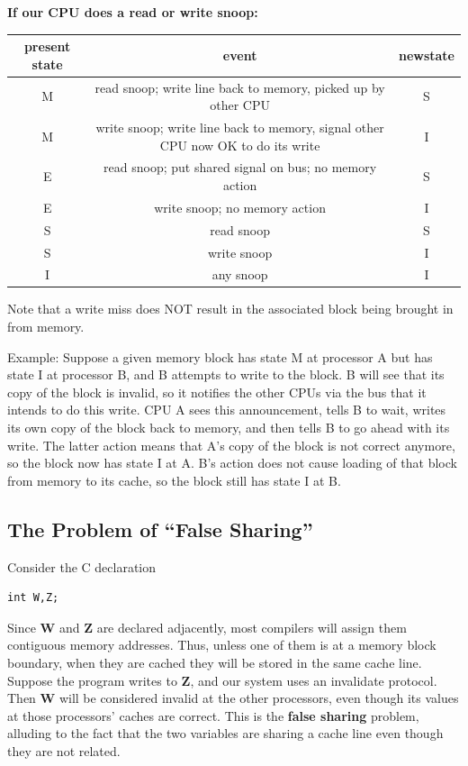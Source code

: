 \par{} \vspace{0.3cm}

{\bf If our CPU does a read or write snoop:}

\begin{tabular}{|c|c|c|}
\hline 
present state&
 event&
 newstate\\
\hline 
M&
 read snoop; write line back to memory, picked up by other CPU&
 S\\
\hline 
M&
 write snoop; write line back to memory, signal other CPU now OK to do its
 write&
 I\\
\hline 
E&
 read snoop; put shared signal on bus; no memory action&
 S\\
\hline 
E&
 write snoop; no memory action&
 I\\
\hline 
S&
 read snoop&
 S\\
\hline 
S&
 write snoop&
 I\\
\hline 
I&
 any snoop&
 I \\
\hline 
\end{tabular}

Note that a write miss does NOT result in the associated block being
brought in from memory.  

Example:  Suppose a given memory block has state M at processor A but
has state I at processor B, and B attempts to write to the block.  B
will see that its copy of the block is invalid, so it notifies the other
CPUs via the bus that it intends to do this write.  CPU A sees this
announcement, tells B to wait, writes its own copy of the block
back to memory, and then tells B to go ahead with its write.  The
latter action means that A's copy of the block is not correct anymore,
so the block now has state I at A.  B's action does not cause loading of
that block from memory to its cache, so the block still has state I at
B.

\par{} \vspace{0.3cm}

\subsection{The Problem of ``False Sharing''}

Consider the C declaration

\begin{Verbatim}[fontsize=\relsize{-2}]
int W,Z;
\end{Verbatim}

Since {\bf W} and {\bf Z} are declared adjacently, most compilers will
assign them contiguous memory addresses.  Thus, unless one of them is at
a memory block boundary, when they are cached they will be stored in the
same cache line.  Suppose the program writes to {\bf Z}, and our system
uses an invalidate protocol.  Then {\bf W} will be considered invalid at
the other processors, even though its values at those processors' caches
are correct.  This is the {\bf false sharing} problem, alluding to the
fact that the two variables are sharing a cache line even though they
are not related.

